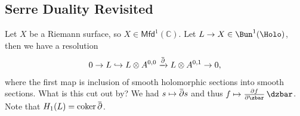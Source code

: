 \hypertarget{serre-duality-revisited}{%
\subsection{Serre Duality Revisited}\label{serre-duality-revisited}}

\begin{remark}

Let \(X\) be a Riemann surface, so
\(X\in {\mathsf{Mfd}}^1({\mathbb{C}})\). Let
\(L\to X \in \Bun^1(\Holo)\), then we have a resolution
\begin{align*}
0 \to L \hookrightarrow L\otimes A^{0, 0} \xrightarrow{\mkern 1.5mu\overline{\mkern-1.5mu{\partial}\mkern-1.5mu}\mkern 1.5mu} L \otimes A^{0, 1} \to 0
,\end{align*}
where the first map is inclusion of smooth holomorphic sections into
smooth sections. What is this cut out by? We had
\(s\mapsto \mkern 1.5mu\overline{\mkern-1.5mu{\partial}\mkern-1.5mu}\mkern 1.5mus\)
and thus \(f \mapsto {\frac{\partial f}{\partial \zbar}\,} \dzbar\).
Note that
\(H_1(L) = \operatorname{coker}\mkern 1.5mu\overline{\mkern-1.5mu{\partial}\mkern-1.5mu}\mkern 1.5mu\).

\end{remark}

